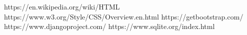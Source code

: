 \begin{thebibliography}{9}
	https://en.wikipedia.org/wiki/HTML
	https://www.w3.org/Style/CSS/Overview.en.html
	https://getbootstrap.com/
	https://www.djangoproject.com/
	https://www.sqlite.org/index.html
\end{thebibliography}